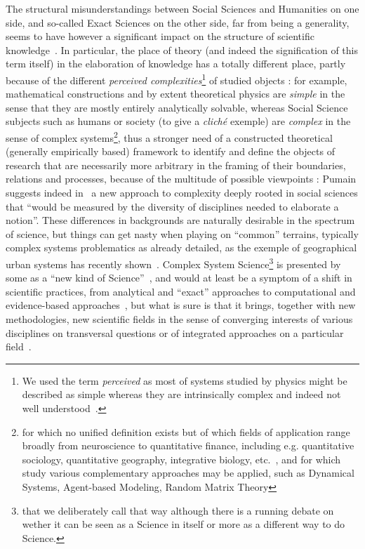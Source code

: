 The structural misunderstandings between Social Sciences and Humanities on one side, and so-called Exact Sciences on the other side, far from being a generality, seems to have however a significant impact on the structure of scientific knowledge~\cite{2015arXiv151103981H}. In particular, the place of theory (and indeed the signification of this term itself) in the elaboration of knowledge has a totally different place, partly because of the different \emph{perceived complexities}\footnote{We used the term \emph{perceived} as most of systems studied by physics might be described as simple whereas they are intrinsically complex and indeed not well understood~\cite{laughlin2006different}.} of studied objects : for example, mathematical constructions and by extent theoretical physics are \emph{simple} in the sense that they are mostly entirely analytically solvable, whereas Social Science subjects such as humans or society (to give a \emph{clich{\'e}} exemple) are \emph{complex} in the sense of complex systems\footnote{for which no unified definition exists but of which fields of application range broadly from neuroscience to quantitative finance, including e.g. quantitative sociology, quantitative geography, integrative biology, etc.~\cite{newman2011complex}, and for which study various complementary approaches may be applied, such as Dynamical Systems, Agent-based Modeling, Random Matrix Theory}, thus a stronger need of a constructed theoretical (generally empirically based) framework to identify and define the objects of research that are necessarily more arbitrary in the framing of their boundaries, relations and processes, because of the multitude of possible viewpoints : Pumain suggests indeed in~\cite{pumain2005cumulativite} a new approach to complexity deeply rooted in social sciences that ``would be measured by the diversity of disciplines needed to elaborate a notion''. These differences in backgrounds are naturally desirable in the spectrum of science, but things can get nasty when playing on ``common'' terrains, typically complex systems problematics as already detailed, as the exemple of geographical urban systems has recently shown~\cite{dupuy2015sciences}. Complex System Science\footnote{that we deliberately call that way although there is a running debate on wether it can be seen as a Science in itself or more as a different way to do Science.} is presented by some as a ``new kind of Science''~\cite{wolfram2002new}, and would at least be a symptom of a shift in scientific practices, from analytical and ``exact'' approaches to computational and evidence-based approaches~\cite{arthur2015complexity}, but what is sure is that it brings, together with new methodologies, new scientific fields in the sense of converging interests of various disciplines on transversal questions or of integrated approaches on a particular field~\cite{2009arXiv0907.2221B}.



